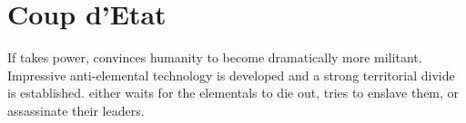 \documentclass[green]{elementals}
\begin{document}
\section{Coup d'Etat}

If \cDema{\intro} takes power, \cDema{\they} convinces humanity to become dramatically more militant. Impressive anti-elemental technology is developed and a strong territorial divide is established. \cDema{} either waits for the elementals to die out, tries to enslave them, or assassinate their leaders.
\end{document}
